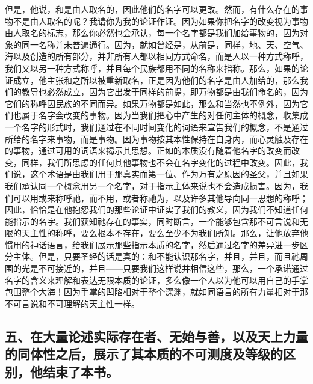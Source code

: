但是，他说，和是由人取名的，因此他们的名字可以更改。然而，有什么存在的事物不是由人取名的呢？我请你为我的论证作证。因为如果你把名字的改变视为事物由人取名的标志，那么你必然也会承认，每一个名字都是我们加给事物的，因为对象的同一名称并未普遍通行。因为，就如曾经是，从前是，同样，地、天、空气、海以及创造的所有部分，并非所有人都以相同方式命名，而是人以一种方式称呼，我们又以另一种方式称呼，并且每个民族都用不同的名称来指称。那么，如果的论证成立，他主张和之所以被重新取名，正是因为他们的名字是由人加给的，那么我们的教导也必然成立，因为它出发于同样的前提，即万物都是由我们命名的，因为它们的称呼因民族的不同而异。如果万物都是如此，那么和当然也不例外，因为它们也属于名字会改变的事物。因为当我们把心中产生的对任何主体的概念，收集成一个名字的形式时，我们通过在不同时间变化的词语来宣告我们的概念，不是通过所给的名字来事物，而是事物。因为事物按其本性保持在自身内，而心灵触及存在的事物，通过可用的词语来揭示其思想。正如的本质没有随着他名字的改变而改变，同样，我们所思虑的任何其他事物也不会在名字变化的过程中改变。因此，我们说，这个术语是由我们用于那真实而第一位、作为万有之原因的圣父，并且如果我们承认同一个概念用另一个名字，对于指示主体来说也不会造成损害。因为，我们可以用或来称呼祂，而不用，或者称祂为，以及许多其他导向同一思想的称呼；因此，恰恰是在他抱怨我们的那些论证中证实了我们的教义，因为我们不知道任何能指示的名字。我们获知祂存在的事实，同时断言，一个能够包含那不可言说和无限的天主性的称呼，要么根本不存在，要么至少不为我们所知。那么，让他放弃他惯用的神话语言，给我们展示那些指示本质的名字，然后通过名字的差异进一步区分主体。但是，只要圣经的话是真的：和不能认识那名字，并且，并且，而且祂周围的光是不可接近的，并且——只要我们这样说并相信这些，那么，一个承诺通过名字的含义来理解和表达无限本质的论证，多么像一个人以为他可以用自己的手掌包围整个大海！因为手掌的凹陷相对于整个深渊，就如同语言的所有力量相对于那不可言说和不可理解的天主性一样。\par


\subsection{五、在大量论述实际存在者、无始与善，以及天上力量的同体性之后，展示了其本质的不可测度及等级的区别，他结束了本书。}

